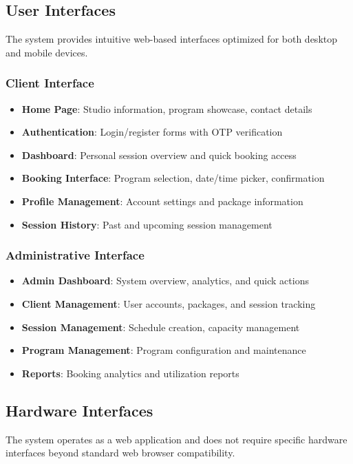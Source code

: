 \documentclass[12pt,a4paper]{article}
\begin{document}
\subsection{User Interfaces}
The system provides intuitive web-based interfaces optimized for both desktop and mobile devices.

\subsubsection{Client Interface}
\begin{itemize}
    \item \textbf{Home Page}: Studio information, program showcase, contact details
    \item \textbf{Authentication}: Login/register forms with OTP verification
    \item \textbf{Dashboard}: Personal session overview and quick booking access
    \item \textbf{Booking Interface}: Program selection, date/time picker, confirmation
    \item \textbf{Profile Management}: Account settings and package information
    \item \textbf{Session History}: Past and upcoming session management
\end{itemize}

\subsubsection{Administrative Interface}
\begin{itemize}
    \item \textbf{Admin Dashboard}: System overview, analytics, and quick actions
    \item \textbf{Client Management}: User accounts, packages, and session tracking
    \item \textbf{Session Management}: Schedule creation, capacity management
    \item \textbf{Program Management}: Program configuration and maintenance
    \item \textbf{Reports}: Booking analytics and utilization reports
\end{itemize}

\subsection{Hardware Interfaces}
The system operates as a web application and does not require specific hardware interfaces beyond standard web browser compatibility.
\end{document}

